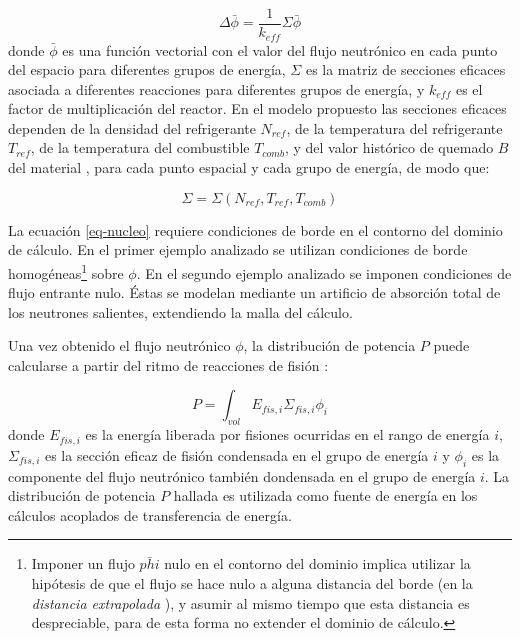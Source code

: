 \begin{equation}
\Delta \bar{\phi} = \frac{1}{k_{eff}}\Sigma \bar{\phi}
\label{eq-nucleo}
\end{equation}
donde $\bar{\phi}$ es una función vectorial con el valor del flujo neutrónico en cada punto del espacio para diferentes grupos de energía,
$\Sigma$ es la matriz de secciones eficaces asociada a diferentes reacciones para diferentes grupos de energía,
y $k_{eff}$ es el factor de multiplicación del reactor.
En el modelo propuesto las secciones eficaces dependen de la densidad del refrigerante $N_{ref}$, de la temperatura del refrigerante $T_{ref}$, de la temperatura del combustible $T_{comb}$, 
y del valor histórico de quemado $B$ del material \cite{lamarsh},
para cada punto espacial y cada grupo de energía, de modo que:

\begin{equation}
\Sigma = \Sigma \left ( N_{ref}, T_{ref}, T_{comb} \right )
\label{eq-sigma}
\end{equation}

La ecuación \ref{eq-nucleo} requiere condiciones de borde en el contorno del dominio de cálculo.
En el primer ejemplo analizado se utilizan condiciones de borde homogéneas\footnote{
Imponer un flujo $\bar{phi}$ nulo en el contorno del dominio implica utilizar la hipótesis de que el flujo se hace nulo a alguna distancia del borde (en la \textit{distancia extrapolada} \cite{lamarsh}),
y asumir al mismo tiempo que esta distancia es despreciable, para de esta forma no extender el dominio de cálculo.
} sobre $\phi$.
En el segundo ejemplo analizado se imponen condiciones de flujo entrante nulo.
Éstas se modelan mediante un artificio de absorción total de los neutrones salientes, extendiendo la malla del cálculo.

Una vez obtenido el flujo neutrónico $\phi$,
la distribución de potencia $P$ puede calcularse a partir del ritmo de reacciones de fisión \cite{lamarsh}:

\begin{equation}
P = \int_{vol} E_{fis,i} \Sigma_{fis,i} \phi_{i}
\label{power}
\end{equation}
donde $E_{fis,i}$ es la energía liberada por fisiones ocurridas en el rango de energía $i$,
$\Sigma_{fis,i}$ es la sección eficaz de fisión condensada en el grupo de energía $i$ y
$\phi_{i}$ es la componente del flujo neutrónico también dondensada en el grupo de energía $i$.
La distribución de potencia ${P}$ hallada es utilizada como fuente de energía en los cálculos acoplados de transferencia de energía.


